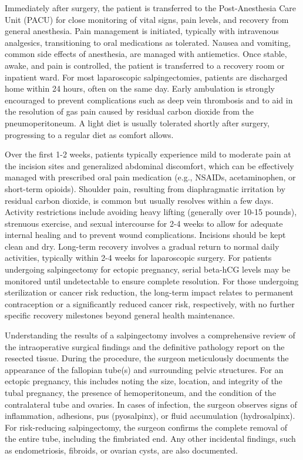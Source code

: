 Immediately after surgery, the patient is transferred to the Post-Anesthesia Care Unit (PACU) for close monitoring of vital signs, pain levels, and recovery from general anesthesia. Pain management is initiated, typically with intravenous analgesics, transitioning to oral medications as tolerated. Nausea and vomiting, common side effects of anesthesia, are managed with antiemetics. Once stable, awake, and pain is controlled, the patient is transferred to a recovery room or inpatient ward. For most laparoscopic salpingectomies, patients are discharged home within 24 hours, often on the same day. Early ambulation is strongly encouraged to prevent complications such as deep vein thrombosis and to aid in the resolution of gas pain caused by residual carbon dioxide from the pneumoperitoneum. A light diet is usually tolerated shortly after surgery, progressing to a regular diet as comfort allows.

Over the first 1-2 weeks, patients typically experience mild to moderate pain at the incision sites and generalized abdominal discomfort, which can be effectively managed with prescribed oral pain medication (e.g., NSAIDs, acetaminophen, or short-term opioids). Shoulder pain, resulting from diaphragmatic irritation by residual carbon dioxide, is common but usually resolves within a few days. Activity restrictions include avoiding heavy lifting (generally over 10-15 pounds), strenuous exercise, and sexual intercourse for 2-4 weeks to allow for adequate internal healing and to prevent wound complications. Incisions should be kept clean and dry. Long-term recovery involves a gradual return to normal daily activities, typically within 2-4 weeks for laparoscopic surgery. For patients undergoing salpingectomy for ectopic pregnancy, serial beta-hCG levels may be monitored until undetectable to ensure complete resolution. For those undergoing sterilization or cancer risk reduction, the long-term impact relates to permanent contraception or a significantly reduced cancer risk, respectively, with no further specific recovery milestones beyond general health maintenance.

Understanding the results of a salpingectomy involves a comprehensive review of the intraoperative surgical findings and the definitive pathology report on the resected tissue. During the procedure, the surgeon meticulously documents the appearance of the fallopian tube(s) and surrounding pelvic structures. For an ectopic pregnancy, this includes noting the size, location, and integrity of the tubal pregnancy, the presence of hemoperitoneum, and the condition of the contralateral tube and ovaries. In cases of infection, the surgeon observes signs of inflammation, adhesions, pus (pyosalpinx), or fluid accumulation (hydrosalpinx). For risk-reducing salpingectomy, the surgeon confirms the complete removal of the entire tube, including the fimbriated end. Any other incidental findings, such as endometriosis, fibroids, or ovarian cysts, are also documented.

